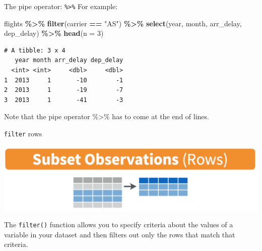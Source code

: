 \documentclass[
  ignorenonframetext,
]{beamer}
\newenvironment{Shaded}{\begin{snugshade}}{\end{snugshade}}
\newcommand{\AttributeTok}[1]{\textcolor[rgb]{0.13,0.29,0.53}{#1}}
\newcommand{\DecValTok}[1]{\textcolor[rgb]{0.00,0.00,0.81}{#1}}
\newcommand{\FunctionTok}[1]{\textcolor[rgb]{0.13,0.29,0.53}{\textbf{#1}}}
\newcommand{\NormalTok}[1]{#1}
\newcommand{\SpecialCharTok}[1]{\textcolor[rgb]{0.81,0.36,0.00}{\textbf{#1}}}
\newcommand{\StringTok}[1]{\textcolor[rgb]{0.31,0.60,0.02}{#1}}
\begin{document}
\begin{frame}[fragile]{The pipe operator: \texttt{\%\textgreater{}\%}}
\protect\hypertarget{the-pipe-operator-3}{}
For example:

\normalsize

\begin{Shaded}
\begin{Highlighting}[]
\NormalTok{flights }\SpecialCharTok{\%\textgreater{}\%} 
  \FunctionTok{filter}\NormalTok{(carrier }\SpecialCharTok{==} \StringTok{"AS"}\NormalTok{) }\SpecialCharTok{\%\textgreater{}\%} 
  \FunctionTok{select}\NormalTok{(year, month, arr\_delay, dep\_delay) }\SpecialCharTok{\%\textgreater{}\%} 
  \FunctionTok{head}\NormalTok{(}\AttributeTok{n =} \DecValTok{3}\NormalTok{)}
\end{Highlighting}
\end{Shaded}

\begin{verbatim}
# A tibble: 3 x 4
   year month arr_delay dep_delay
  <int> <int>     <dbl>     <dbl>
1  2013     1       -10        -1
2  2013     1       -19        -7
3  2013     1       -41        -3
\end{verbatim}

\normalsize

Note that the pipe operator \%\textgreater\% has to come at the end of
lines.
\end{frame}

\begin{frame}[fragile]{\texttt{filter} rows}
\protect\hypertarget{filter-rows}{}
\begin{center}\includegraphics[width=0.7\linewidth,height=0.4\textheight]{week3_1} \end{center}

The \texttt{filter()} function allows you to specify criteria about the
values of a variable in your dataset and then filters out only the rows
that match that criteria.
\end{frame}
\end{document}
